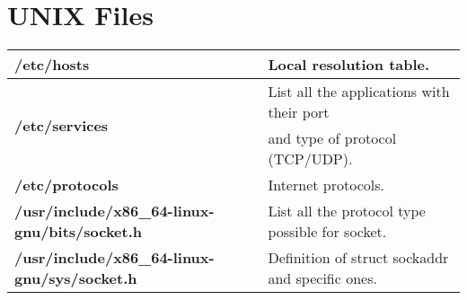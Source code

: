 \section{UNIX Files}\label{files}
\begin{table}[h]
\centering
\footnotesize
\begin{tabular}{|l|l|}
\hline
\textbf{/etc/hosts} & {Local resolution table.}\\
\hline
\multirow{2}{*}{\textbf{/etc/services}} & {List all the applications with their port}\\
& {and type of protocol (TCP/UDP).}\\
\hline
{\textbf{/etc/protocols}} & {Internet protocols.}\\
\hline
{\textbf{/usr/include/x86\_64-linux-gnu/bits/socket.h}} & {List all the protocol type possible for socket.}\\
\hline
{\textbf{/usr/include/x86\_64-linux-gnu/sys/socket.h}} & {Definition of struct sockaddr and specific ones.}\\
\hline
\end{tabular}
\end{table}

